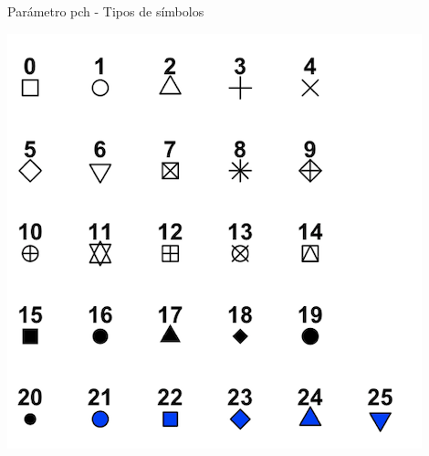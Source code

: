 \documentclass[
  ignorenonframetext,
  aspectratio=169]{beamer}
\begin{document}
\begin{frame}{Parámetro pch - Tipos de símbolos}
\protect\hypertarget{paruxe1metro-pch---tipos-de-suxedmbolos}{}
\begin{center}\includegraphics[width=0.6\linewidth]{Imgs/pch} \end{center}
\end{frame}
\end{document}

